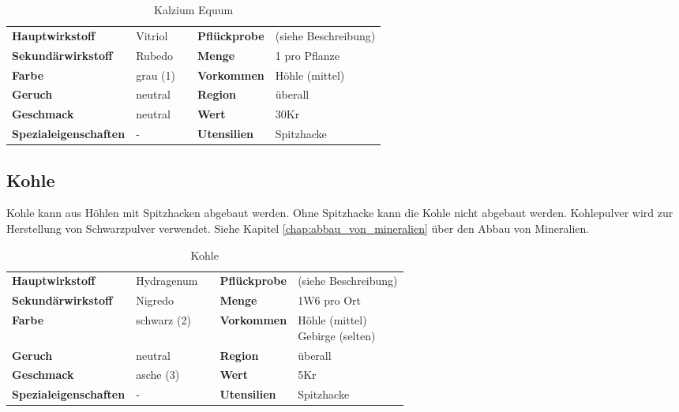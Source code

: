 \begin{table}[h] 
\begin{center} 
\begin{tabular}{|l|l|p{1cm}|l|l|} 
  	\cline{1-2} \cline{4-5} 
  	\textbf{Hauptwirkstoff} & Vitriol && \textbf{Pflückprobe} & (siehe Beschreibung) \\ \cline{1-2} \cline{4-5} 
  	\textbf{Sekundärwirkstoff} & Rubedo && \textbf{Menge} & 1 pro Pflanze \\ \cline{1-2} \cline{4-5} 
  	\textbf{Farbe} & grau (1) && \textbf{Vorkommen} & Höhle (mittel) \\ \cline{1-2} \cline{4-5} 
  	\textbf{Geruch} & neutral && \textbf{Region} & überall \\ \cline{1-2} \cline{4-5} 
  	\textbf{Geschmack} & neutral && \textbf{Wert} & 30Kr \\ \cline{1-2} \cline{4-5} 
  	\textbf{Spezialeigenschaften} & - && \textbf{Utensilien} & Spitzhacke \\ \cline{1-2} \cline{4-5} 
\end{tabular} 
\end{center} 
\caption{Kalzium Equum} 
\label{tab:kalzium_equum} 
\end{table}


\subsection{Kohle}
\label{chap:kohle}
Kohle kann aus Höhlen mit Spitzhacken abgebaut werden. Ohne Spitzhacke kann die Kohle nicht abgebaut werden. Kohlepulver wird zur Herstellung von Schwarzpulver verwendet. Siehe Kapitel \ref{chap:abbau_von_mineralien} über den Abbau von Mineralien.

\begin{table}[h] 
\begin{center} 
\begin{tabular}{|l|l|p{1cm}|l|l|} 
  	\cline{1-2} \cline{4-5} 
  	\textbf{Hauptwirkstoff} & Hydragenum && \textbf{Pflückprobe} & (siehe Beschreibung) \\ \cline{1-2} \cline{4-5} 
  	\textbf{Sekundärwirkstoff} & Nigredo && \textbf{Menge} & 1W6 pro Ort \\ \cline{1-2} \cline{4-5} 
  	\textbf{Farbe} & schwarz (2) && \textbf{Vorkommen} & \brcell{Höhle (mittel) \\ Gebirge (selten)} \\ \cline{1-2} \cline{4-5} 
  	\textbf{Geruch} & neutral && \textbf{Region} & überall \\ \cline{1-2} \cline{4-5} 
  	\textbf{Geschmack} & asche (3) && \textbf{Wert} & 5Kr \\ \cline{1-2} \cline{4-5} 
  	\textbf{Spezialeigenschaften} & - && \textbf{Utensilien} & Spitzhacke \\ \cline{1-2} \cline{4-5} 
\end{tabular} 
\end{center} 
\caption{Kohle} 
\label{tab:kohle} 
\end{table}


